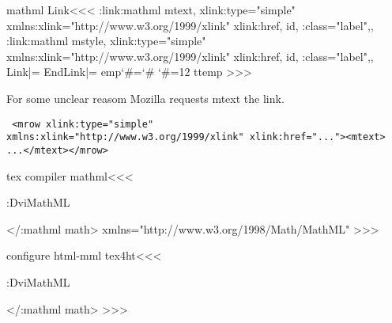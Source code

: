 {{\<mathml Link\><<<
\LinkCommand\mtxt:link{\a:mathml mtext,%
   xlink:type="simple"
   xmlns:xlink="http://www.w3.org/1999/xlink" 
   xlink:href,
   id, \mml:class="label",,}
\LinkCommand\msp:link{\a:mathml mstyle,%
   xlink:type="simple"
   xmlns:xlink="http://www.w3.org/1999/xlink"
   xlink:href,
   id, \mml:class="label",,}
\let\M:Link|=\Link
\def\Link{\ifmathml
     \ifmtext |<end mtext space|>\HCode{</\a:mathml mtext>}%
              \expandafter\expandafter\expandafter\mtxt:link
     \else    \expandafter\expandafter\expandafter\msp:link\fi
   \else \expandafter\M:Link\fi}
\let\M:EndLink|=\EndLink
\edef\:temp{\catcode`\#=\the\catcode`\#}
\catcode`\#=12
   \def\EndLink{\ifmathml 
      \ifmtext    |<end mtext space|>%
          \Endmtxt:link \HCode{<\a:mathml mtext\Hnewline 
                  \mml:class="endlabel">}|<start sharp mtext space|>%
           \else  \HCode{</\a:mathml mstyle><!--endlabel-->}\fi
       \else \expandafter\M:EndLink\fi}  
\:temp
>>>

For some unclear reasom Mozilla requests mtext the link.

\begin{verbatim} <mrow xlink:type="simple"
xmlns:xlink="http://www.w3.org/1999/xlink" xlink:href="..."><mtext>
...</mtext></mrow> \end{verbatim}




\<tex compiler mathml\><<<
    {\a:DviMathML \mathmltrue
       \ifOption{mml-fonts}{}{|%
       \IgnoreRule \HCode{<!--l.
       \the\inputlineno-->}\Tg<\a:mathml math\Hnewline
           \csname a:math-xmlns\endcsname \Hnewline \a:@math>\a:math
       |<sv dvimath par|>\IgnorePar}
    {\Tg</\a:mathml math>\EndIgnoreRule
     \ifOption{mml-fonts}{}{|%
     \mathmlfalse \b:DviMathML |<recall dvimath par|>}
  { xmlns="http://www.w3.org/1998/Math/MathML" }
>>>


\<configure html-mml tex4ht\><<<
    {\a:DviMathML \mathmltrue
       \ifOption{mml-fonts}{|<mml fonts|>}{|%
       \IgnoreRule \HCode{<!--l.
       \the\inputlineno-->}\Tg<\a:mathml math\Hnewline
           \csname a:math-xmlns\endcsname \Hnewline \a:@math>\a:math
       |<sv dvimath par|>\IgnorePar}
    {\Tg</\a:mathml math>\EndIgnoreRule
     \ifOption{mml-fonts}{|<html fonts|>}{|%
     \mathmlfalse \b:DviMathML |<recall dvimath par|>}
>>>

}}}}}}
